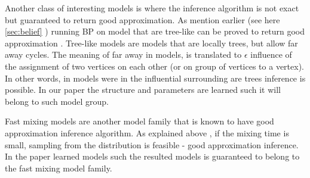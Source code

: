 Another class of interesting  models is where the inference algorithm is not exact but guaranteed to return good approximation. 
As mention earlier (see here \ref{sec:belief} ) running BP on model that are tree-like can be proved to return good approximation \cite{dembo2010ising}.
Tree-like models are models that are locally trees, but allow far away cycles.
The meaning of far away in models, is translated to $\epsilon$ influence of the assignment of two vertices on each other (or on group of vertices to a vertex).
In other words, in models were in the influential surrounding  are trees inference is possible.
In our paper \cite{heinemann2014inferning} the structure and parameters are learned such it will belong to such model group.

Fast mixing models are another model family that  is known to have good approximation inference algorithm.
As explained above  , if the mixing time is small, sampling from the distribution is feasible - good approximation inference. 
In the paper \cite{domke2015maximum} learned models such the resulted models is guaranteed to belong to the fast mixing model family.

 
